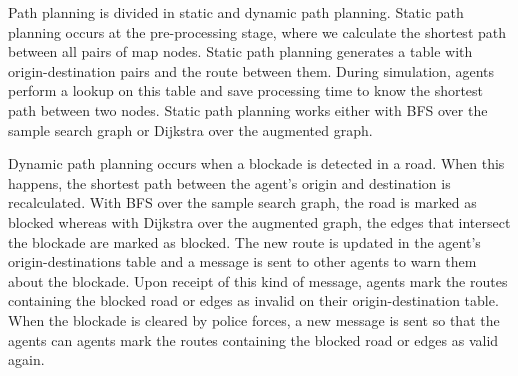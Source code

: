 Path planning is divided in static and dynamic path planning. Static path planning occurs at the pre-processing stage, where we calculate the shortest path between all pairs of map nodes. %
Static path planning generates a table with origin-destination pairs and the route between them. During simulation, agents perform a lookup on this table and save processing time to know the shortest path between two nodes. Static path planning works either with BFS over the sample search graph or Dijkstra over the augmented graph.

Dynamic path planning occurs when a blockade is detected in a road. When this happens, the shortest path between the agent's origin and destination is recalculated. With BFS over the sample search graph, the road is marked as blocked whereas with Dijkstra over the augmented graph, the edges that intersect the blockade are marked as blocked. 
The new route is updated in the agent's origin-destinations table and a message is sent to other agents to warn them about the blockade. Upon receipt of this kind of message, agents mark the routes containing the blocked road or edges as invalid on their origin-destination table. When the blockade is cleared by police forces, a new message is sent so that the agents can agents mark the routes containing the blocked road or edges as valid again.

